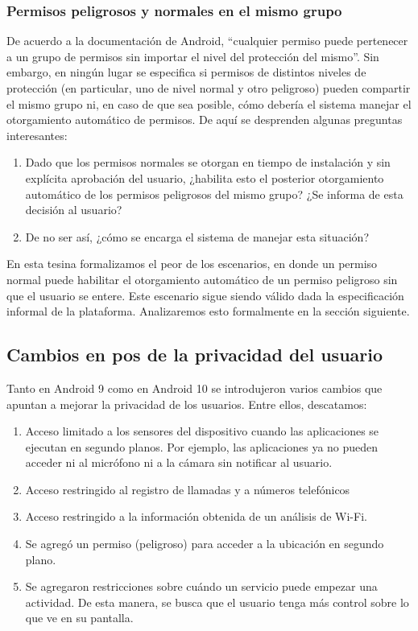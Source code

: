 \subsubsection{Permisos peligrosos y normales en el mismo grupo}
De acuerdo a la documentación de Android, ``cualquier permiso puede pertenecer a un grupo de permisos sin
importar el nivel del protección del mismo''\cite{android-permissions}. Sin embargo, en ningún lugar se
especifica si permisos de distintos niveles de protección (en particular, uno de nivel normal y otro
peligroso) pueden compartir el mismo grupo ni, en caso de que sea posible, cómo debería el sistema
manejar el otorgamiento automático de permisos. De aquí se desprenden algunas preguntas interesantes:
\begin{enumerate}
    \item Dado que los permisos normales se otorgan en tiempo de instalación y sin explícita aprobación
    del usuario, ¿habilita esto el posterior otorgamiento automático de los permisos peligrosos del mismo
    grupo? ¿Se informa de esta decisión al usuario?
    \item De no ser así, ¿cómo se encarga el sistema de manejar esta situación? 
\end{enumerate}
En esta tesina formalizamos el peor de los escenarios, en donde un permiso normal puede habilitar el
otorgamiento automático de un permiso peligroso sin que el usuario se entere. Este escenario sigue siendo
válido dada la especificación informal de la plataforma. Analizaremos esto formalmente en la sección
siguiente.


\subsection{Cambios en pos de la privacidad del usuario}
Tanto en Android 9 como en Android 10 se introdujeron varios cambios que apuntan a mejorar la privacidad
de los usuarios. Entre ellos, descatamos:
\begin{enumerate}
    \item Acceso limitado a los sensores del dispositivo cuando las aplicaciones se ejecutan en segundo
    planos. Por ejemplo, las aplicaciones ya no pueden acceder ni al micrófono ni a la cámara sin
    notificar al usuario.
    \item Acceso restringido al registro de llamadas y a números telefónicos
    \item Acceso restringido a la información obtenida de un análisis de Wi-Fi.
    \item Se agregó un permiso (peligroso) para acceder a la ubicación en segundo plano.
    \item Se agregaron restricciones sobre cuándo un servicio puede empezar una actividad. De esta
    manera, se busca que el usuario tenga más control sobre lo que ve en su pantalla.
\end{enumerate}

